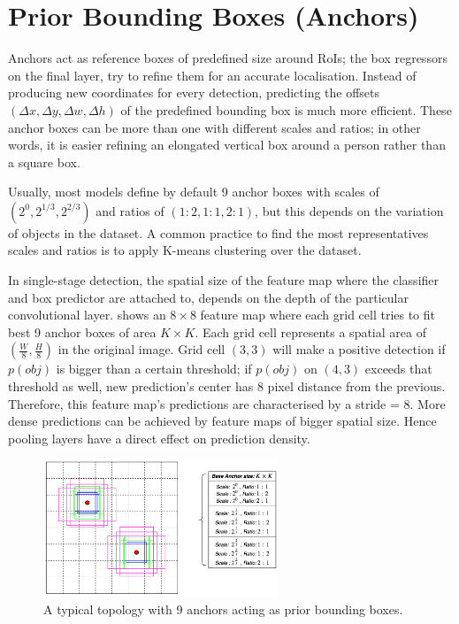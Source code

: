 \section{Prior Bounding Boxes (Anchors)}
Anchors act as reference boxes of predefined size around RoIs; the box regressors on the final layer, try to refine them for an accurate localisation. Instead of producing new coordinates for every detection, predicting the offsets $(\Delta x, \Delta y, \Delta w, \Delta h)$ of the predefined bounding box is much more efficient. These anchor boxes can be more than one with different scales and ratios; in other words, it is easier refining an elongated vertical box around a person rather than a square box. 

Usually, most models define by default 9 anchor boxes with scales of $(2^0, 2^{1/3}, 2^{2/3})$ and ratios of $(1\!:\!2,1\!:\!1,2\!:\!1)$, but this depends on the variation of objects in the dataset. A common practice to find the most representatives scales and ratios is to apply K-means clustering over the dataset.

In single-stage detection, the spatial size of the feature map where the classifier and box predictor are attached to, depends on the depth of the particular convolutional layer.  shows an $8\times8$ feature map where each grid cell tries to fit best 9 anchor boxes of area $K\times K$. Each grid cell represents a spatial area of $(\frac{W}{8}, \frac{H}{8})$ in the original image. Grid cell $(3,3)$ will make a positive detection if $p(obj)$ is bigger than a certain threshold; if $p(obj)$ on $(4,3)$ exceeds that threshold as well, new prediction's center has 8 pixel distance from the previous. Therefore, this feature map's predictions are characterised by a stride = 8. More dense predictions can be achieved by feature maps of bigger spatial size. Hence pooling layers have a direct effect on prediction density.

 \begin{figure}[!htb]
  \centering
  \includegraphics[width=7cm]{images/ch2/fig7.png}
  \caption{A typical topology with 9 anchors acting as prior bounding boxes.}
  \label{fig7}
\end{figure} 

